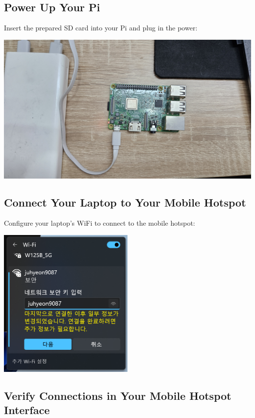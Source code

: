 \documentclass[
  letterpaper,
]{scrbook}
\begin{document}
\hypertarget{power-up-your-pi}{%
\subsection{Power Up Your Pi}\label{power-up-your-pi}}

Insert the prepared SD card into your Pi and plug in the power:

\includegraphics{content/material/ch2/plug_pi_wifi.jpg}

\hypertarget{connect-your-laptop-to-your-mobile-hotspot}{%
\subsection{Connect Your Laptop to Your Mobile
Hotspot}\label{connect-your-laptop-to-your-mobile-hotspot}}

Configure your laptop's WiFi to connect to the mobile hotspot:

\includegraphics[width=0.5\textwidth,height=\textheight]{content/material/ch2/laptop_wifi.png}

\hypertarget{verify-connections-in-your-mobile-hotspot-interface}{%
\subsection{Verify Connections in Your Mobile Hotspot
Interface}\label{verify-connections-in-your-mobile-hotspot-interface}}
\end{document}
